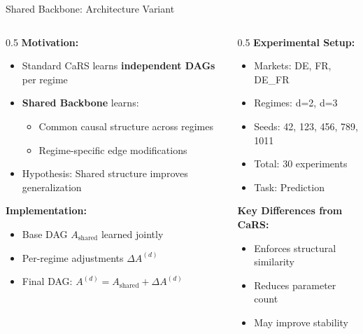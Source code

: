 \documentclass[aspectratio=169]{beamer}
\begin{document}
\begin{frame}{Shared Backbone: Architecture Variant}
\begin{columns}
\begin{column}{0.5\textwidth}
\textbf{Motivation:}
\begin{itemize}
    \item Standard CaRS learns \textbf{independent DAGs} per regime
    \item \textbf{Shared Backbone} learns:
    \begin{itemize}
        \item Common causal structure across regimes
        \item Regime-specific edge modifications
    \end{itemize}
    \item Hypothesis: Shared structure improves generalization
\end{itemize}

\vspace{0.3cm}
\textbf{Implementation:}
\begin{itemize}
    \item Base DAG $A_{\text{shared}}$ learned jointly
    \item Per-regime adjustments $\Delta A^{(d)}$
    \item Final DAG: $A^{(d)} = A_{\text{shared}} + \Delta A^{(d)}$
\end{itemize}
\end{column}

\begin{column}{0.5\textwidth}
\textbf{Experimental Setup:}
\begin{itemize}
    \item Markets: DE, FR, DE\_FR
    \item Regimes: d=2, d=3
    \item Seeds: 42, 123, 456, 789, 1011
    \item Total: 30 experiments
    \item Task: Prediction
\end{itemize}

\vspace{0.3cm}
\textbf{Key Differences from CaRS:}
\begin{itemize}
    \item Enforces structural similarity
    \item Reduces parameter count
    \item May improve stability
\end{itemize}
\end{column}
\end{columns}
\end{frame}
\end{document}
